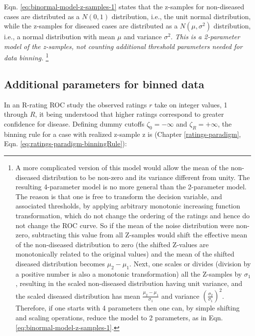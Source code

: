 \documentclass[
]{book}
\begin{document}
Eqn. \eqref{eq:binormal-model-z-samples-1} states that the z-samples for non-diseased cases are distributed as a \(N(0,1)\) distribution, i.e., the unit normal distribution, while the z-samples for diseased cases are distributed as a \(N(\mu,\sigma^2)\) distribution, i.e., a normal distribution with mean \(\mu\) and variance \(\sigma^2\). \emph{This is a 2-parameter model of the z-samples, not counting additional threshold parameters needed for data binning.} \footnote{A more complicated version of this model would allow the mean of the non-diseased distribution to be non-zero and its variance different from unity. The resulting 4-parameter model is no more general than the 2-parameter model. The reason is that one is free to transform the decision variable, and associated thresholds, by applying arbitrary monotonic increasing function transformation, which do not change the ordering of the ratings and hence do not change the ROC curve. So if the mean of the noise distribution were non-zero, subtracting this value from all Z-samples would shift the effective mean of the non-diseased distribution to zero (the shifted Z-values are monotonically related to the original values) and the mean of the shifted diseased distribution becomes \(\mu_2-\mu_1\). Next, one scales or divides (division by a positive number is also a monotonic transformation) all the Z-samples by \(\sigma_1\), resulting in the scaled non-diseased distribution having unit variance, and the scaled diseased distribution has mean \(\frac{\mu_2-\mu_1}{\sigma_1}\) and variance \((\frac{\sigma_2}{\sigma_1})^2\). Therefore, if one starts with 4 parameters then one can, by simple shifting and scaling operations, reduce the model to 2 parameters, as in Eqn. \eqref{eq:binormal-model-z-samples-1}.}

\hypertarget{additional-parameters-for-binned-data}{%
\subsection{Additional parameters for binned data}\label{additional-parameters-for-binned-data}}

In an R-rating ROC study the observed ratings \(r\) take on integer values, 1 through \(R\), it being understood that higher ratings correspond to greater confidence for disease. Defining dummy cutoffs \(\zeta_0 = -\infty\) and \(\zeta_R = +\infty\), the binning rule for a case with realized z-sample z is (Chapter \ref{ratings-paradigm}, Eqn. \eqref{eq:ratings-paradigm-binningRule}):
\end{document}
